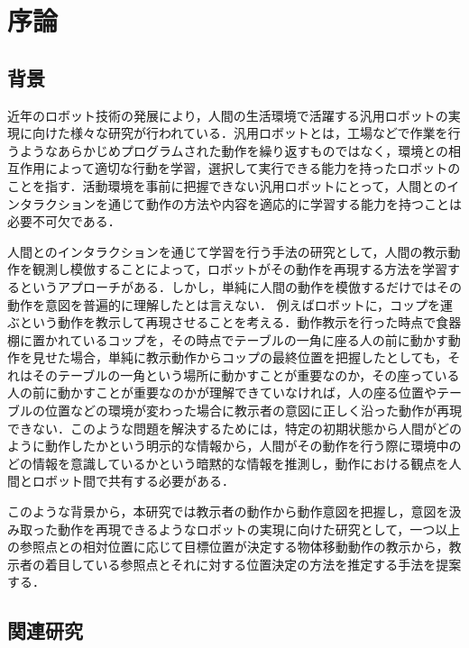 ﻿%
\chapter{序論}

\section{背景}

近年のロボット技術の発展により，人間の生活環境で活躍する汎用ロボットの実現に向けた様々な研究が行われている．汎用ロボットとは，工場などで作業を行うようなあらかじめプログラムされた動作を繰り返すものではなく，環境との相互作用によって適切な行動を学習，選択して実行できる能力を持ったロボットのことを指す．活動環境を事前に把握できない汎用ロボットにとって，人間とのインタラクションを通じて動作の方法や内容を適応的に学習する能力を持つことは必要不可欠である．

人間とのインタラクションを通じて学習を行う手法の研究として，人間の教示動作を観測し模倣することによって，ロボットがその動作を再現する方法を学習するというアプローチがある．しかし，単純に人間の動作を模倣するだけではその動作を意図を普遍的に理解したとは言えない．
例えばロボットに，コップを運ぶという動作を教示して再現させることを考える．動作教示を行った時点で食器棚に置かれているコップを，その時点でテーブルの一角に座る人の前に動かす動作を見せた場合，単純に教示動作からコップの最終位置を把握したとしても，それはそのテーブルの一角という場所に動かすことが重要なのか，その座っている人の前に動かすことが重要なのかが理解できていなければ，人の座る位置やテーブルの位置などの環境が変わった場合に教示者の意図に正しく沿った動作が再現できない．このような問題を解決するためには，特定の初期状態から人間がどのように動作したかという明示的な情報から，人間がその動作を行う際に環境中のどの情報を意識しているかという暗黙的な情報を推測し，動作における観点を人間とロボット間で共有する必要がある．

このような背景から，本研究では教示者の動作から動作意図を把握し，意図を汲み取った動作を再現できるようなロボットの実現に向けた研究として，一つ以上の参照点との相対位置に応じて目標位置が決定する物体移動動作の教示から，教示者の着目している参照点とそれに対する位置決定の方法を推定する手法を提案する．

\section{関連研究}

